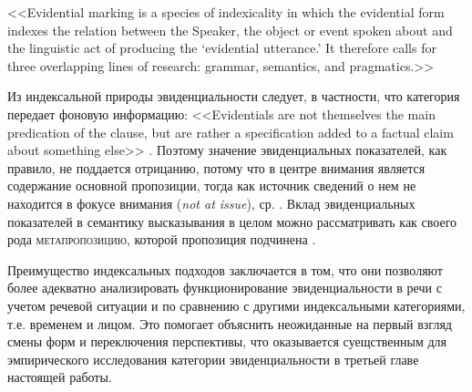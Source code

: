 \begin{displayquote}
<<Evidential marking is a species of indexicality in which the evidential form indexes the relation between the Speaker, the object or event spoken about and the linguistic act of producing the `evidential utterance.’ It therefore calls for three overlapping lines of research: grammar, semantics, and pragmatics.>>\\
\citep[169]{hanks2014}
\end{displayquote}

Из индексальной природы эвиденциальности следует, в частности, что категория передает фоновую информацию: 
<<Evidentials are not themselves the main predication of the clause, but are rather a specification added to a factual claim about something else>> \citep[274]{anderson1986}. Поэтому значение эвиденциальных показателей, как правило, не поддается отрицанию, потому что в центре внимания является содержание основной пропозиции, тогда как источник сведений о нем не находится в фокусе внимания (\textit{not at issue}), ср. \citep[28--30]{murray2017}. Вклад эвиденциальных показателей в семантику высказывания в целом можно рассматривать как своего рода \textsc{метапропозицию}, которой пропозиция подчинена \citep[151]{evans2018}. %
\par Преимущество индексальных подходов заключается в том, что они позволяют более адекватно анализировать функционирование эвиденциальности в речи с учетом речевой ситуации и по сравнению с другими индексальными категориями, т.е. временем и лицом. Это помогает объяснить неожиданные на первый взгляд смены форм и переключения перспективы, что оказывается суещственным для эмпирического исследования категории эвиденциальности в третьей главе настоящей работы.

